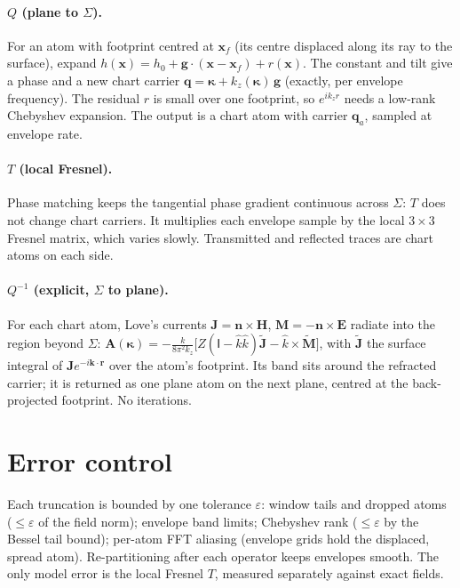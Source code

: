 \documentclass[11pt,a4paper]{article}
\newcommand{\ve}[1]{\bm{#1}}
\newcommand{\kp}{\boldsymbol\kappa}
\begin{document}
\paragraph{$Q$ (plane to $\Sigma$).} For an atom with footprint centred at
$\ve x_f$ (its centre displaced along its ray to the surface), expand
$h(\ve x)=h_0+\ve g\cdot(\ve x-\ve x_f)+r(\ve x)$. The constant and tilt give
a phase and a new chart carrier $\ve q=\kp+k_z(\kp)\,\ve g$ (exactly, per
envelope frequency). The residual $r$ is small over one footprint, so
$e^{ik_z r}$ needs a low-rank Chebyshev expansion. The output is a chart
atom with carrier $\ve q_a$, sampled at envelope rate.

\paragraph{$T$ (local Fresnel).} Phase matching keeps the tangential phase
gradient continuous across $\Sigma$: $T$ does not change chart carriers. It
multiplies each envelope sample by the local $3\times3$ Fresnel matrix, which
varies slowly. Transmitted and reflected traces are chart atoms on each side.

\paragraph{$Q^{-1}$ (explicit, $\Sigma$ to plane).} For each chart atom,
Love's currents $\ve J=\ve n\times\ve H$, $\ve M=-\ve n\times\ve E$ radiate
into the region beyond $\Sigma$:
$\ve A(\kp)=-\frac{k}{8\pi^2k_z}\big[Z(\mathsf I-\hat k\hat k)\tilde{\ve J}
-\hat k\times\tilde{\ve M}\big]$, with $\tilde{\ve J}$ the surface integral
of $\ve J e^{-i\ve k\cdot\ve r}$ over the atom's footprint. Its band sits
around the refracted carrier; it is returned as one plane atom on the next
plane, centred at the back-projected footprint. No iterations.

\section{Error control}
Each truncation is bounded by one tolerance $\varepsilon$: window tails and
dropped atoms ($\le\varepsilon$ of the field norm); envelope band limits;
Chebyshev rank ($\le\varepsilon$ by the Bessel tail bound); per-atom FFT
aliasing (envelope grids hold the displaced, spread atom). Re-partitioning
after each operator keeps envelopes smooth. The only model error is the local
Fresnel $T$, measured separately against exact fields.
\end{document}

